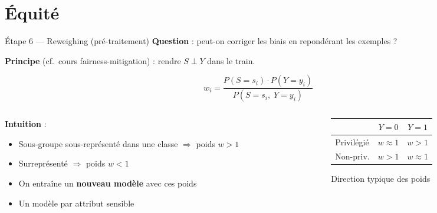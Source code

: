 \documentclass[aspectratio=169, 11pt]{beamer}
\begin{document}
\section{\'Equit\'e}

\begin{frame}{\'Etape 6 --- Reweighing (pr\'e-traitement)}
\textbf{Question} : peut-on corriger les biais en repondérant les exemples ?

\vspace{0.3em}
\textbf{Principe} (cf.~cours fairness-mitigation) : rendre $S \perp Y$ dans le train.

$$w_i = \frac{P(S{=}s_i) \cdot P(Y{=}y_i)}{P(S{=}s_i,\; Y{=}y_i)}$$

\begin{columns}[T]
\begin{column}{0.52\textwidth}
\textbf{Intuition} :
\begin{itemize}
    \item Sous-groupe sous-repr\'esent\'e dans une classe $\Rightarrow$ poids $w > 1$
    \item Surrepr\'esent\'e $\Rightarrow$ poids $w < 1$
    \item On entra\^ine un \textbf{nouveau mod\`ele} avec ces poids
    \item Un mod\`ele par attribut sensible
\end{itemize}
\end{column}
\begin{column}{0.44\textwidth}
\centering\small
\begin{tabular}{lcc}
\toprule
& $Y{=}0$ & $Y{=}1$ \\
\midrule
Privil\'egi\'e & $w \approx 1$ & $w > 1$ \\
Non-priv. & $w > 1$ & $w \approx 1$ \\
\bottomrule
\end{tabular}

\vspace{0.5em}
\scriptsize Direction typique des poids
\end{column}
\end{columns}
\end{frame}
\end{document}
